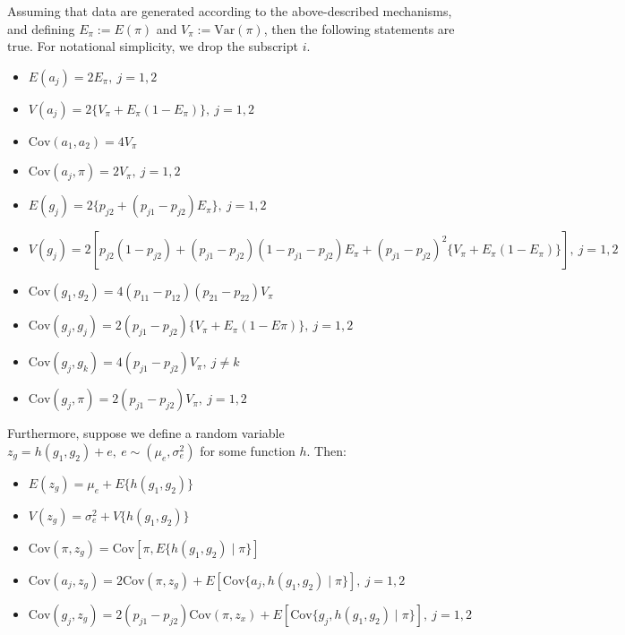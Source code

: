 \documentclass[12pt]{article}
\begin{document}
Assuming that data are generated according to the above-described mechanisms, and defining $E_\pi := E(\pi)$ and $V_\pi :=   \text{Var}(\pi)$, then the following statements are true. 
For notational simplicity, we drop the subscript $i$. 

\begin{itemize}
\item $E(a_j) = 2E_\pi, \ j = 1, 2$
\item $V(a_j) = 2\{V_\pi + E_\pi(1-E_\pi)\}, \ j = 1, 2$
\item $\text{Cov}(a_1, a_2) = 4V_\pi$
\item $\text{Cov}(a_j, \pi) = 2V_\pi, \ j = 1, 2$
\item $E(g_j) = 2\{p_{j2} + (p_{j1}-p_{j2})E_\pi\}, \ j = 1, 2$
\item $V(g_j) = 2[p_{j2}(1-p_{j2}) + (p_{j1}-p_{j2})(1-p_{j1}-p_{j2})E_\pi + (p_{j1}-p_{j2})^2\{V_\pi + E_\pi(1-E_\pi)\}], \ j = 1, 2$
\item $\text{Cov}(g_1, g_2) = 4(p_{11}-p_{12})(p_{21}-p_{22})V_\pi$
\item $\text{Cov}(g_j, g_j) = 2(p_{j1}-p_{j2})\{V_\pi + E_\pi(1-E\pi)\}, \ j = 1, 2$
\item $\text{Cov}(g_j, g_k) = 4(p_{j1}-p_{j2})V_\pi, \ j \neq k$
\item $\text{Cov}(g_j, \pi) = 2(p_{j1}-p_{j2})V_\pi, \ j = 1, 2$
\end{itemize}

Furthermore, suppose we define a random variable %
$z_g = h(g_1, g_2) + e, \ e \sim (\mu_e, \sigma_e^2)$ for some function $h$. Then:
\begin{itemize}
\item $E(z_g) = \mu_e + E\{h(g_1, g_2)\}$
\item $V(z_g) = \sigma_e^2 + V\{h(g_1, g_2)\}$
\item $\text{Cov}(\pi, z_g) = \text{Cov}[\pi, E\{h(g_1,g_2) \mid \pi\}]$ 
\item  $\text{Cov}(a_j, z_g) = 2\text{Cov}(\pi, z_g) + E[\text{Cov}\{a_j, h(g_1,g_2) \mid \pi\}], \ j = 1, 2$
\item $\text{Cov}(g_j, z_g) = 2(p_{j1}-p_{j2}) \text{Cov}(\pi, z_x) + E[\text{Cov}\{g_j, h(g_1,g_2) \mid \pi\}], \ j = 1,2$
\end{itemize}
\end{document}

